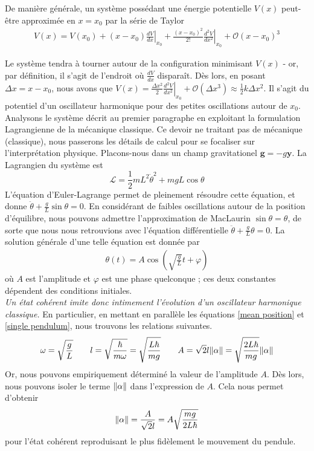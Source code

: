 \documentclass[11pt,oneside,a4paper]{article}
\newcommand{\h}{\ensuremath{\hbar}}
\begin{document}
De manière générale, un système possédant une énergie potentielle $V(x)$ peut-être approximée en $x=x_0$ par la série de Taylor
\begin{align*}
  V(x) = V(x_0) + \left(x-x_0\right)\left.\frac{dV}{dx}\right|_{x_0} + \frac{\left(x-x_0\right)^2}{2!} \left.\frac{d^2V}{dx^2}\right|_{x_0} + \mathcal O(x-x_0)^3
\end{align*} 

Le système tendra à tourner autour de la configuration minimisant $V(x)$ - or, par définition, il s'agit de l'endroit où $\frac{dV}{dx}$ disparaît. Dès lors, en posant $\Delta x = x-x_0$, nous avons que $V(x) = \frac{\Delta x^2}{2} \left.\frac{d^2V}{dx^2}\right|_{x_0} + \mathcal O(\Delta x^3) \approx \frac{1}{2}k\Delta x^2$. Il s'agit du potentiel d'un oscillateur harmonique pour des petites oscillations autour de $x_0$.\\

Analysons le système décrit au premier paragraphe en exploitant la formulation Lagrangienne de la mécanique classique. Ce devoir ne traitant pas de mécanique (classique), nous passerons les détails de calcul pour se focaliser sur l'interprétation physique. Placons-nous dans un champ gravitationel $\bm{g} = -g\bm{\bm{y}}$. La Lagrangien du système est 
\begin{equation*}
  \mathcal{L} = \frac{1}{2}mL^2\dot{\theta}^2 + mgL\cos\theta 
\end{equation*}
L'équation d'Euler-Lagrange permet de pleinement résoudre cette équation, et donne $\ddot{\theta} + \frac{g}{L}\sin\theta =  0$. En considérant de faibles oscillations autour de la position d'équilibre, nous pouvons admettre l'approximation de MacLaurin $\sin\theta=\theta$, de sorte que nous nous retrouvions avec l'équation différentielle $\ddot{\theta} + \frac{g}{L}\theta = 0$. La solution générale d'une telle équation est donnée par
\begin{align}
  \label{single pendulum}
  \theta(t) = A\cos(\sqrt{\frac{g}{L}}t+\varphi)
\end{align}
où $A$ est l'amplitude et $\varphi$ est une phase quelconque ; ces deux constantes dépendent des conditions initiales.\\

\emph{Un état cohérent imite donc intimement l'évolution d'un oscillateur harmonique classique.} En particulier, en mettant en parallèle les équations \eqref{mean position} et \eqref{single pendulum}, nous trouvons les relations suivantes.
\begin{equation}
  \omega = \sqrt{\frac{g}{L}}\qquad
  l = \sqrt{\frac{\h}{m\omega}} = \sqrt{\frac{L\h}{mg}}\qquad
  A = \sqrt{2}l\norm{\alpha} = \sqrt{\frac{2L\h}{mg}}\norm{\alpha} \label{eq:46}
\end{equation}
Or, nous pouvons empiriquement déterminé la valeur de l'amplitude $A$. Dès lors, nous pouvons isoler le terme $\norm{\alpha}$ dans l'expression de $A$. Cela nous permet d'obtenir
\begin{equation}
  \label{89}
  \norm{\alpha}= \frac{A}{\sqrt{2}l} = A\sqrt{\frac{mg}{2L\h}} 
\end{equation}
pour l'état cohérent reproduisant le plus fidèlement le mouvement du pendule.\\
\end{document}
